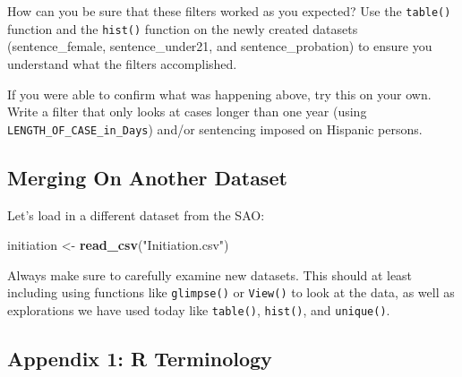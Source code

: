 \documentclass[]{article}
\newenvironment{Shaded}{\begin{snugshade}}{\end{snugshade}}
\newcommand{\KeywordTok}[1]{\textcolor[rgb]{0.13,0.29,0.53}{\textbf{#1}}}
\newcommand{\StringTok}[1]{\textcolor[rgb]{0.31,0.60,0.02}{#1}}
\newcommand{\NormalTok}[1]{#1}
\begin{document}
How can you be sure that these filters worked as you expected? Use the
\texttt{table()} function and the \texttt{hist()} function on the newly
created datasets (sentence\_female, sentence\_under21, and
sentence\_probation) to ensure you understand what the filters
accomplished.

If you were able to confirm what was happening above, try this on your
own. Write a filter that only looks at cases longer than one year (using
\texttt{LENGTH\_OF\_CASE\_in\_Days}) and/or sentencing imposed on
Hispanic persons.

\pagebreak

\subsection{Merging On Another
Dataset}\label{merging-on-another-dataset}

Let's load in a different dataset from the SAO:

\begin{Shaded}
\begin{Highlighting}[]
\NormalTok{initiation <-}\StringTok{ }\KeywordTok{read_csv}\NormalTok{(}\StringTok{"Initiation.csv"}\NormalTok{)}
\end{Highlighting}
\end{Shaded}

Always make sure to carefully examine new datasets. This should at least
including using functions like \texttt{glimpse()} or \texttt{View()} to
look at the data, as well as explorations we have used today like
\texttt{table()}, \texttt{hist()}, and \texttt{unique()}.

\pagebreak

\subsection{Appendix 1: R Terminology}\label{appendix-1-r-terminology}
\end{document}
